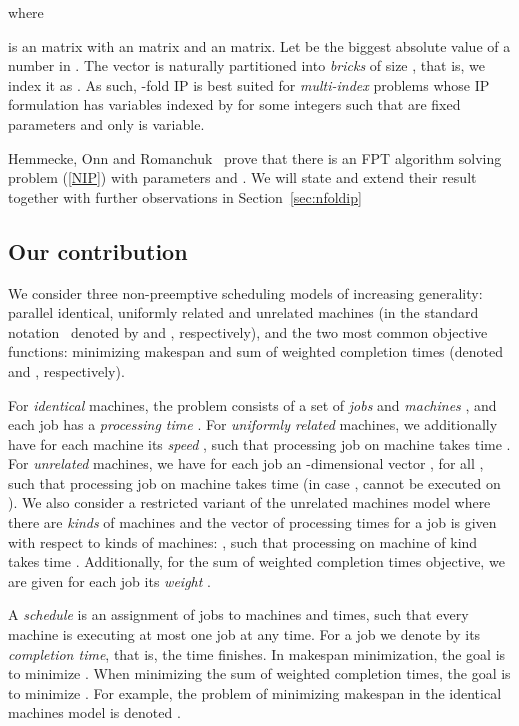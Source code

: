 \documentclass{llncs}
\newcommand{\FPT}{{\sf FPT}\xspace}
\begin{document}
where

is an  matrix with  an 
matrix and  an 
matrix. Let  be the biggest absolute value of a number in . The vector  is naturally partitioned into  \textit{bricks} of size , that is, we index it as . As such, -fold IP is best suited for \textit{multi-index} problems whose IP formulation has variables indexed by  for some integers  such that  are fixed parameters and only  is variable.

Hemmecke, Onn and Romanchuk~\cite{HemmeckeOR:13} prove that there is an \FPT algorithm solving problem (\ref{NIP}) with parameters  and . We will state and extend their result together with further observations in Section~\ref{sec:nfoldip} 

\subsection{Our contribution}

We consider three non-preemptive scheduling models of increasing generality: parallel identical, uniformly related and unrelated machines (in the standard notation~\cite{LawlerLKS:93} denoted by  and , respectively), and the two most common objective functions: minimizing makespan and sum of weighted completion times (denoted  and , respectively).

For \textit{identical} machines, the problem consists of a set of  \textit{jobs}  and  \textit{machines} , and each job  has a \textit{processing time} . For \textit{uniformly related} machines, we additionally have for each machine  its \textit{speed} , such that processing job  on machine  takes time . For \textit{unrelated} machines, we have for each job  an -dimensional vector ,  for all , such that processing job  on machine  takes time  (in case ,  cannot be executed on ). We also consider a restricted variant of the unrelated machines model where there are  \textit{kinds} of machines and the vector of processing times for a job  is given with respect to kinds of machines: , such that processing  on machine  of kind  takes time .
Additionally, for the sum of weighted completion times objective, we are given for each job  its \textit{weight} .

A \textit{schedule} is an assignment of jobs to machines and times, such that every machine is executing at most one job at any time. For a job  we denote by  its \textit{completion time}, that is, the time  finishes. In makespan minimization, the goal is to minimize . When minimizing the sum of weighted completion times, the goal is to minimize . For example, the problem of minimizing makespan in the identical machines model is denoted . 
\end{document}
